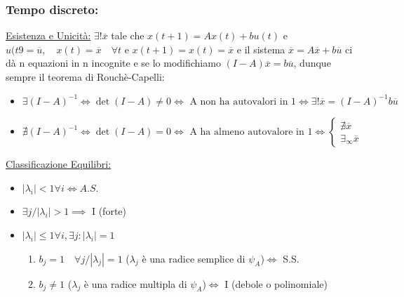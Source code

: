 \documentclass[a4paper]{report}
\begin{document}
\subsubsection{Tempo discreto:}
\underline{Esistenza e Unicità:}\newline
\smallskip
$\exists!\overline{x}$ tale che $x(t+1)=Ax(t)+bu(t)$ e $u(t9=\overline{u}, \quad x(t)=\overline{x}\quad\forall t$ e $x(t+1)=x(t)=\overline{x}$ e il sistema $\overline{x}=A\overline{x}+b\overline{u}$ ci dà n equazioni in n incognite e se lo modifichiamo $(I-A)\overline{x}=b\overline{u}$, dunque sempre il teorema di Rouchè-Capelli:
\begin{itemize}
\item $\exists(I-A)^{-1}\iff\det(I-A)\neq0\iff\text{ A non ha autovalori in 1}\iff \exists!\overline{x}=(I-A)^{-1}b\overline{u}$
\item $\nexists (I-A)^{-1}\iff\det(I-A)=0\iff\text{ A ha almeno autovalore in 1}\iff\left\{\begin{array}{l}
\nexists \overline{x}\\
\exists_\infty \overline{x}
\end{array}\right.$
\end{itemize}
\underline{Classificazione Equilibri:}
\begin{itemize}
\item $|\lambda_i|<1 \forall i\iff A.S.$
\item $\exists j/|\lambda_i|>1\implies$ I (forte)
\item $|\lambda_i|\leq 1 \forall i, \exists j:|\lambda_i|=1$ \begin{enumerate}
\item $b_j=1\quad \forall j/|\lambda_j|=1$ ($\lambda_j$ è una radice semplice di $\psi_A$)$\iff$ S.S.
\item $b_j\neq 1$ ($\lambda_j$ è una radice multipla di $\psi_A$)$\iff$ I (debole o polinomiale)
\end{enumerate}
\end{itemize}
\end{document}
